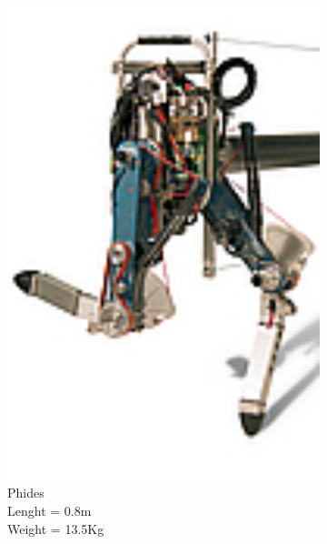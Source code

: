 \begin{figure}[htb]
\begin{subfigure}{.22\textwidth}
    \includegraphics[width=0.9\linewidth]{figures/w_phides.pdf}
    \caption{Phides\\
    Lenght = 0.8m\\
    Weight = 13.5Kg}
    \label{fig:w_phides}
  \end{subfigure}
  \begin{subfigure}{.22\textwidth} 

\end{subfigure}
\end{figure}
